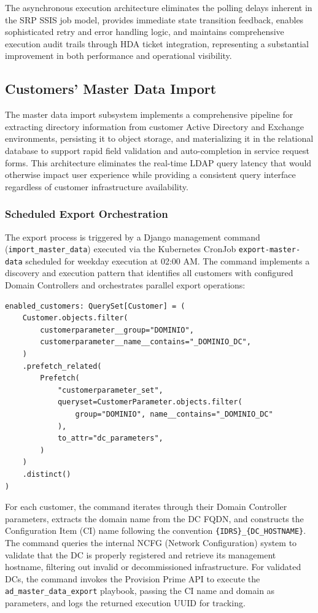 The asynchronous execution architecture eliminates the polling delays inherent in the SRP SSIS job model, provides immediate state transition feedback, enables sophisticated retry and error handling logic, and maintains comprehensive execution audit trails through HDA ticket integration, representing a substantial improvement in both performance and operational visibility.
 
\subsection{Customers' Master Data Import}

The master data import subsystem implements a comprehensive pipeline for extracting directory information from customer Active Directory and Exchange environments, persisting it to object storage, and materializing it in the relational database to support rapid field validation and auto-completion in service request forms. This architecture eliminates the real-time LDAP query latency that would otherwise impact user experience while providing a consistent query interface regardless of customer infrastructure availability.

\subsubsection{Scheduled Export Orchestration}

The export process is triggered by a Django management command (\texttt{import\_master\_data}) executed via the Kubernetes CronJob \texttt{export-master-data} scheduled for weekday execution at 02:00 AM. The command implements a discovery and execution pattern that identifies all customers with configured Domain Controllers and orchestrates parallel export operations:

\begin{verbatim}
enabled_customers: QuerySet[Customer] = (
    Customer.objects.filter(
        customerparameter__group="DOMINIO",
        customerparameter__name__contains="_DOMINIO_DC",
    )
    .prefetch_related(
        Prefetch(
            "customerparameter_set",
            queryset=CustomerParameter.objects.filter(
                group="DOMINIO", name__contains="_DOMINIO_DC"
            ),
            to_attr="dc_parameters",
        )
    )
    .distinct()
)
\end{verbatim}

For each customer, the command iterates through their Domain Controller parameters, extracts the domain name from the DC FQDN, and constructs the Configuration Item (CI) name following the convention \texttt{\{IDRS\}\_\{DC\_HOSTNAME\}}. The command queries the internal NCFG (Network Configuration) system to validate that the DC is properly registered and retrieve its management hostname, filtering out invalid or decommissioned infrastructure. For validated DCs, the command invokes the Provision Prime API to execute the \texttt{ad\_master\_data\_export} playbook, passing the CI name and domain as parameters, and logs the returned execution UUID for tracking.


